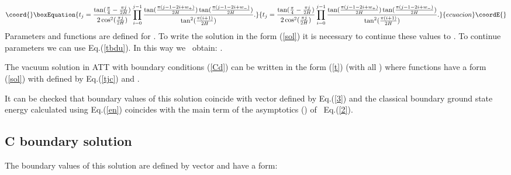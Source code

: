 \documentclass[a4paper,12pt,titlepage,final]{article}
\begin{document}
\begin{equation}\coord{}\boxEquation{
t_{j}=\frac{\tan (\frac{\pi }{4}-\frac{\pi j}{2H})}
{2\cos ^{2}(\frac{\pi j}{2H})}\prod_{i=0}^{j-1}
\frac{\tan (\frac{\pi (j-1-2i+w_{+})}{2H})
\tan (\frac{\pi (j-1-2i+w_{-})}{2H})}
{\tan ^{2}(\frac{\pi (i+1)}{2H})}.  \label{tjc}
}{
t_{j}=\frac{\tan (\frac{\pi }{4}-\frac{\pi j}{2H})}
{2\cos ^{2}(\frac{\pi j}{2H})}\prod_{i=0}^{j-1}
\frac{\tan (\frac{\pi (j-1-2i+w_{+})}{2H})
\tan (\frac{\pi (j-1-2i+w_{-})}{2H})}
{\tan ^{2}(\frac{\pi (i+1)}{2H})}.  }{ecuacion}\coordE{}\end{equation}
Parameters \coordHE{} and functions \coordHE{}
are defined for \coordHE{}. To write the solution in the form (\ref{sol}) it
is necessary to continue these values to \coordHE{}. To continue
parameters
\coordHE{} we can use Eq.(\ref{tbdu}). In this way we \ obtain:
\coordHE{}  \coordHE{}.

The vacuum solution in \coordHE{} ATT with boundary conditions
(\ref{Cd}) can be written in the form (\ref{t})
(with all \coordHE{}) where functions
\coordHE{} have a form (\ref{sol}) with \coordHE{} defined by
Eq.(\ref{tjc}) and
\coordHE{}.

It can be checked that boundary values of this solution coincide with
vector
\coordHE{} defined by Eq.(\ref{3}) and the classical boundary
ground state energy calculated using Eq.(\ref{en}) coincides with the main
term of the asymptotics (\coordHE{}) of \ Eq.(\ref{2}).

\subsection{C\coordHE{} boundary solution}

The boundary values of this solution are defined by vector \coordHE{}
and have a form:
\end{document}
